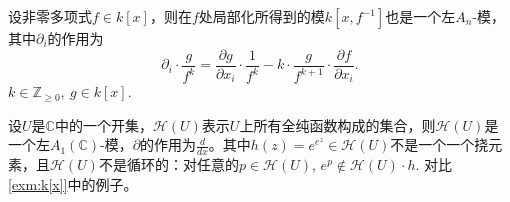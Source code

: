 \begin{example}
    \label{exm:k[x,f^{-1}]}
    设非零多项式$f\in k[x]$，则在$f$处局部化所得到的模$k[x,f^{-1}]$也是一个左$A_n$-模，其中$\partial_i$的作用为
    \begin{equation*}
        \partial_i\cdot \frac{g}{f^k}=\frac{\partial g}{\partial x_i}\cdot \frac{1}{f^k}-k\cdot \frac{g}{f^{k+1}}\cdot \frac{\partial f}{\partial x_i}.
    \end{equation*}
    $k \in \mathbb{Z}_{\geq 0},\ g \in k[x].$
\end{example}

\begin{example}
    设$U$是$\mathbb{C}$中的一个开集，$\mathcal{H}(U)$表示$U$上所有全纯函数构成的集合，则$\mathcal{H}(U)$是一个左$A_1(\mathbb{C})$-模，$\partial$的作用为$\frac{d}{dx}$。其中$h(z)=e^{e^z}\in \mathcal{H}(U)$不是一个一个挠元素，且$\mathcal{H}(U)$不是循环的：对任意的$p\in \mathcal{H}(U)$, $e^p\notin \mathcal{H}(U)\cdot h$.
    对比 \ref{exm:k[x]}中的例子。
\end{example}



\newpage
